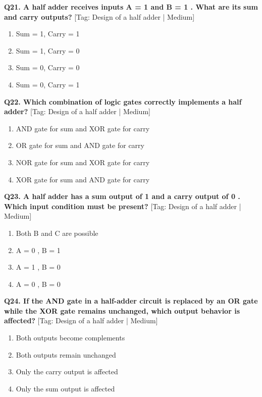 \noindent\textbf{Q21. A half adder receives inputs A = 1 and B = 1 . What are its sum and carry outputs?} \hfill [Tag: Design of a half adder | Medium]
\begin{enumerate}[label=(\alph*),topsep=2pt,itemsep=1pt,partopsep=0pt,parsep=0pt]
    \item {Sum = 1, Carry = 1}
    \item {Sum = 1, Carry = 0}
    \item {Sum = 0, Carry = 0}
    \item {Sum = 0, Carry = 1}
\end{enumerate}
\vspace{2mm}

\noindent\textbf{Q22. Which combination of logic gates correctly implements a half adder?} \hfill [Tag: Design of a half adder | Medium]
\begin{enumerate}[label=(\alph*),topsep=2pt,itemsep=1pt,partopsep=0pt,parsep=0pt]
    \item {AND gate for sum and XOR gate for carry}
    \item {OR gate for sum and AND gate for carry}
    \item {NOR gate for sum and XOR gate for carry}
    \item {XOR gate for sum and AND gate for carry}
\end{enumerate}
\vspace{2mm}

\noindent\textbf{Q23. A half adder has a sum output of 1 and a carry output of 0 . Which input condition must be present?} \hfill [Tag: Design of a half adder | Medium]
\begin{enumerate}[label=(\alph*),topsep=2pt,itemsep=1pt,partopsep=0pt,parsep=0pt]
    \item {Both B and C are possible}
    \item {A = 0 , B = 1}
    \item {A = 1 , B = 0}
    \item {A = 0 , B = 0}
\end{enumerate}
\vspace{2mm}

\noindent\textbf{Q24. If the AND gate in a half-adder circuit is replaced by an OR gate while the XOR gate remains unchanged, which output behavior is affected?} \hfill [Tag: Design of a half adder | Medium]
\begin{enumerate}[label=(\alph*),topsep=2pt,itemsep=1pt,partopsep=0pt,parsep=0pt]
    \item {Both outputs become complements}
    \item {Both outputs remain unchanged}
    \item {Only the carry output is affected}
    \item {Only the sum output is affected}
\end{enumerate}
\vspace{2mm}

